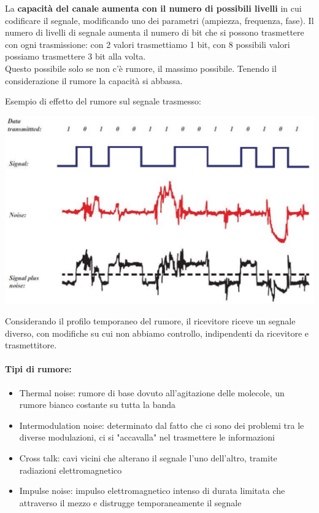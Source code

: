 La \textbf{capacità del canale aumenta con il numero di possibili livelli} in cui codificare il segnale, modificando uno dei parametri (ampiezza, frequenza, fase). Il numero di livelli di segnale aumenta il numero di bit che si possono trasmettere con ogni trasmissione: con 2 valori trasmettiamo 1 bit, con 8 possibili valori possiamo trasmettere 3 bit alla volta. \\

Questo possibile solo se non c'è rumore, il massimo possibile. Tenendo il considerazione il rumore la capacità si abbassa.

Esempio di effetto del rumore sul segnale trasmesso: 
\begin{center}
	\includegraphics[width=\linewidth]{img/PTT/errors1}
\end{center}
Considerando il profilo temporaneo del rumore, il ricevitore riceve un segnale diverso, con modifiche su cui non abbiamo controllo, indipendenti da ricevitore e trasmettitore.\\


\paragraph{Tipi di rumore:}
\begin{itemize}
	\item Thermal noise: rumore di base dovuto all'agitazione delle molecole, un rumore bianco costante su tutta la banda
	\item Intermodulation noise: determinato dal fatto che ci sono dei problemi tra le diverse modulazioni, ci si "accavalla" nel trasmettere le informazioni
	\item Cross talk: cavi vicini che alterano il segnale l'uno dell'altro, tramite radiazioni elettromagnetico
	\item Impulse noise: impulso elettromagnetico intenso di durata limitata che attraverso il mezzo e distrugge temporaneamente il segnale
\end{itemize}

